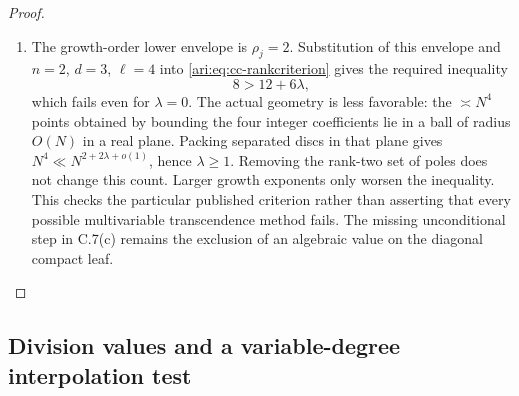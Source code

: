 \begin{proof}
\begin{enumerate}[label=\arabic*.,leftmargin=*]
\item The growth-order lower envelope is $\rho_j=2$. Substitution of
this envelope and $n=2$, $d=3$, $\ell=4$ into
\eqref{ari:eq:cc-rankcriterion} gives the required inequality
\[
 8>12+6\lambda,
\]
which fails even for $\lambda=0$. The actual geometry is
less favorable: the $\asymp N^4$ points obtained by bounding
the four integer coefficients lie in a ball of radius $O(N)$
in a real plane. Packing separated discs in that plane gives
$N^4\ll N^{2+2\lambda+o(1)}$, hence $\lambda\ge1$.
Removing the rank-two set of poles does not change this count.
Larger growth exponents only worsen the inequality. This
checks the particular published criterion rather than asserting
that every possible multivariable transcendence method fails.
The missing unconditional step in C.7(c) remains the exclusion
of an algebraic value on the diagonal compact leaf.
\end{enumerate}
\end{proof}

\subsection{Division values and a variable-degree interpolation test}


